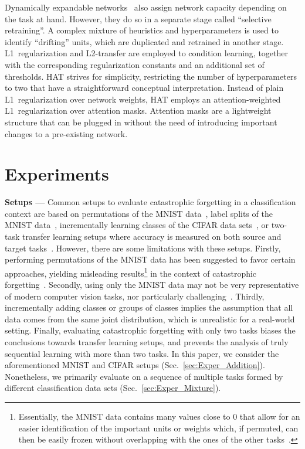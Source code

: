 Dynamically expandable networks~\citep[DEN;][]{Yoon18ICLR} also assign network capacity depending on the task at hand. However, they do so in a separate stage called ``selective retraining''. A complex mixture of heuristics and hyperparameters is used to identify ``drifting'' units, which are duplicated and retrained in another stage. L1~regularization and L2-transfer are employed to condition learning, together with the corresponding regularization constants and an additional set of thresholds. HAT strives for simplicity, restricting the number of hyperparameters to two that have a straightforward conceptual interpretation. Instead of plain L1~regularization over network weights, HAT employs an attention-weighted L1~regularization over attention masks. Attention masks are a lightweight structure that can be plugged in without the need of introducing important changes to a pre-existing network.



\section{Experiments}
\label{sec:Exper}

\textbf{Setups ---} Common setups to evaluate catastrophic forgetting in a classification context are based on permutations of the MNIST data~\cite{Srivastava13NIPS}, label splits of the MNIST data~\cite{Lee17NIPS}, incrementally learning classes of the CIFAR data sets~\cite{LopezPaz17NIPS}, or two-task transfer learning setups where accuracy is measured on both source and target tasks~\cite{Li17PAMI}. However, there are some limitations with these setups. Firstly, performing permutations of the MNIST data has been suggested to favor certain approaches, yielding misleading results\footnote{Essentially, the MNIST data contains many values close to 0 that allow for an easier identification of the important units or weights which, if permuted, can then be easily frozen without overlapping with the ones of the other tasks~\citep[see][]{Lee17NIPS}.} in the context of catastrophic forgetting~\cite{Lee17NIPS}. Secondly, using only the MNIST data may not be very representative of modern computer vision tasks, nor particularly challenging~\cite{Xiao17ARXIV}. Thirdly, incrementally adding classes or groups of classes implies the assumption that all data comes from the same joint distribution, which is unrealistic for a real-world setting. Finally, evaluating catastrophic forgetting with only two tasks biases the conclusions towards transfer learning setups, and prevents the analysis of truly sequential learning with more than two tasks. In this paper, we consider the aforementioned MNIST and CIFAR setups (Sec.~\ref{sec:Exper_Addition}). Nonetheless, we primarily evaluate on a sequence of multiple tasks formed by different classification data sets (Sec.~\ref{sec:Exper_Mixture}). 


